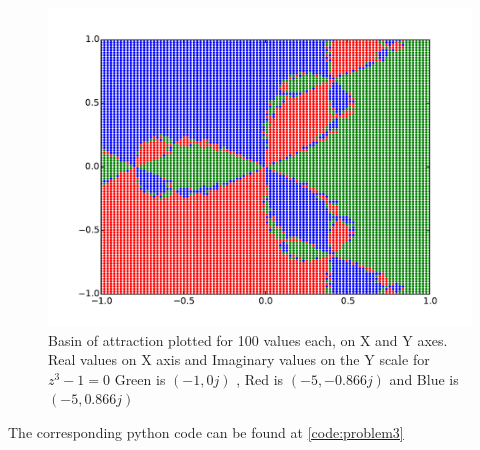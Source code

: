 \documentclass[a4paper,11pt]{article}
\begin{document}
\begin{figure}[h]
	\centering
	\includegraphics[scale=0.45]{figure_q3_new.pdf}
	\caption{Basin of attraction plotted for 100 values each, on X and Y axes. Real values on X axis and Imaginary values on the Y scale for $z^3 - 1 = 0$  Green is $(-1,0j)$ , Red is $(-5, -0.866j)$ and Blue is $(-5, 0.866j)$}
	\label{fig:basin100}
\end{figure}


The corresponding python code can be found at \ref{code:problem3}

\clearpage
\end{document}
